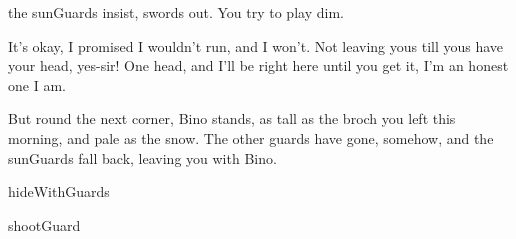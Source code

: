the \glspl{sunGuard} insist, swords out.
You try to play dim.

\begin{speechtext}
  It's okay, I promised I wouldn't run, and I won't.
  Not leaving yous till yous have your head, yes-sir!
  One head, and I'll be right here until you get it, I'm an honest one I am.
\end{speechtext}

But round the next corner, Bino stands, as tall as the broch you left this morning, and pale as the snow.
The other \glspl{guard} have gone, somehow, and the \glspl{sunGuard} fall back, leaving you with Bino.

\begin{selectPath}
  {}%
  {hideWithGuards}

  {}%
  {shootGuard}
\end{selectPath}

